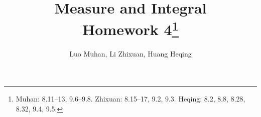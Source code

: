 \documentclass[11pt]{article}
\theoremstyle{definition}
\begin{document}
  \title{\textbf{Measure and Integral}\\ Homework 4\footnote{
    Muhan: 8.11--13, 9.6--9.8.
    Zhixuan: 8.15--17, 9.2, 9.3.
    Heqing: 8.2, 8.8, 8.28, 8.32, 9.4, 9.5.}}
  \author{Luo Muhan, Li Zhixuan, Huang Heqing}
  \maketitle

%
%  
%
%  

%  
  \setcounter{section}{7}
%  
%  
%  
%  
  
  
\end{document}
